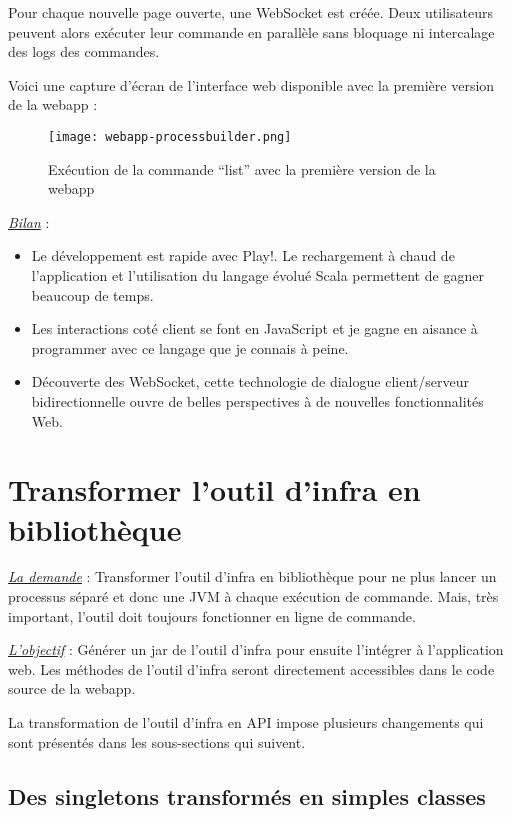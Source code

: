 Pour chaque nouvelle page ouverte, une WebSocket est créée.
Deux utilisateurs peuvent alors exécuter leur commande en parallèle sans
bloquage ni intercalage des logs des commandes.

Voici une capture d'écran de l'interface web disponible avec la première version
de la webapp :
\begin{figure}[H]
  \texttt{[image: webapp-processbuilder.png]}
  \caption{Exécution de la commande ``list'' avec la première version de la webapp}
\end{figure}

\underline{\textit{Bilan}} :
\begin{itemize}
\item Le développement est rapide avec Play!. Le rechargement à
  chaud de l'application et l'utilisation du langage évolué Scala permettent de
  gagner beaucoup de temps.  
\item Les interactions coté client se font en JavaScript et
  je gagne en aisance à programmer avec ce langage que je connais à peine.
\item  Découverte des WebSocket, cette technologie de dialogue client/serveur
  bidirectionnelle ouvre de belles perspectives à de nouvelles fonctionnalités
  Web.
\end{itemize}

\section{Transformer l'outil d'infra en bibliothèque}

\underline{\textit{La demande}} : Transformer l'outil d'infra en bibliothèque pour ne plus
lancer un processus séparé et donc une JVM à chaque exécution de commande.
Mais, très important, l'outil doit toujours fonctionner en ligne de
commande.

\underline{\textit{L'objectif}} : Générer un jar de l'outil d'infra pour ensuite
l'intégrer à l'application web. Les méthodes de l'outil d'infra seront
directement accessibles dans le code source de la webapp.

La transformation de l'outil d'infra en API impose plusieurs changements qui
sont présentés dans les sous-sections qui suivent.

\subsection{Des singletons transformés en simples classes}

